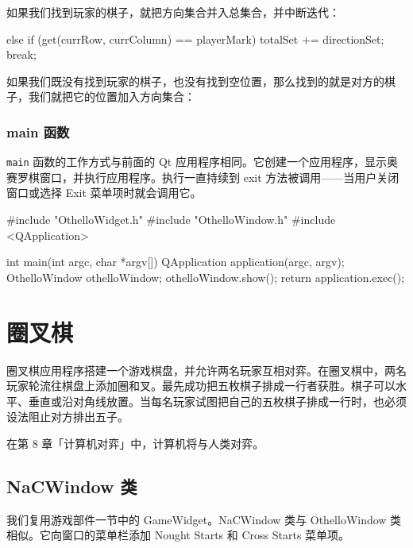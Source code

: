 如果我们找到玩家的棋子，就把方向集合并入总集合，并中断迭代：

\begin{codebox}
      else if (get(currRow, currColumn) == playerMark) {
        totalSet += directionSet;
        break;
      }
\end{codebox}

如果我们既没有找到玩家的棋子，也没有找到空位置，那么找到的就是对方的棋子，我们就把它的位置加入方向集合：

\begin{codebox}
      else {
        directionSet.insert(QPair<int,int>(row, column));
      }
    }
  }
}
\end{codebox}

\subsubsection{main 函数}

\texttt{main} 函数的工作方式与前面的 Qt 应用程序相同。它创建一个应用程序，显示奥赛罗棋窗口，并执行应用程序。执行一直持续到 exit 方法被调用——当用户关闭窗口或选择 Exit 菜单项时就会调用它。

\medskip{}

\begin{codebox}
#include "OthelloWidget.h"
#include "OthelloWindow.h"
#include <QApplication>

int main(int argc, char *argv[]) {
  QApplication application(argc, argv);
  OthelloWindow othelloWindow;
  othelloWindow.show();
  return application.exec();
}
\end{codebox}

\section{圈叉棋}

圈叉棋应用程序搭建一个游戏棋盘，并允许两名玩家互相对弈。在圈叉棋中，两名玩家轮流往棋盘上添加圈和叉。最先成功把五枚棋子排成一行者获胜。棋子可以水平、垂直或沿对角线放置。当每名玩家试图把自己的五枚棋子排成一行时，也必须设法阻止对方排出五子。

在第 8 章「计算机对弈」中，计算机将与人类对弈。

\subsection{NaCWindow 类}

我们复用游戏部件一节中的 GameWidget。NaCWindow 类与 OthelloWindow 类相似。它向窗口的菜单栏添加 Nought Starts 和 Cross Starts 菜单项。

